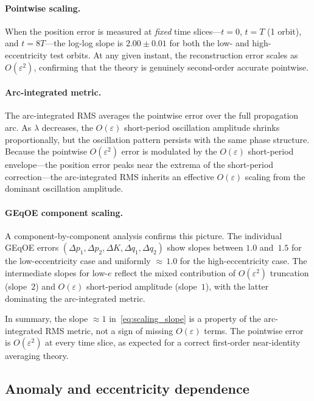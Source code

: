 \documentclass[11pt]{article}
\begin{document}
\paragraph{Pointwise scaling.}
When the position error is measured at \emph{fixed} time slices---$t = 0$,
$t = T$ (1 orbit), and $t = 8T$---the log-log slope is $2.00 \pm 0.01$ for
both the low- and high-eccentricity test orbits. At any given instant, the
reconstruction error scales as $O(\varepsilon^2)$, confirming that the theory
is genuinely second-order accurate pointwise.

\paragraph{Arc-integrated metric.}
The arc-integrated RMS averages the pointwise error over the full propagation
arc. As $\lambda$ decreases, the $O(\varepsilon)$ short-period oscillation
amplitude shrinks proportionally, but the oscillation pattern persists with
the same phase structure. Because the pointwise $O(\varepsilon^2)$ error is
modulated by the $O(\varepsilon)$ short-period envelope---the position error
peaks near the extrema of the short-period correction---the arc-integrated
RMS inherits an effective $O(\varepsilon)$ scaling from the dominant
oscillation amplitude.

\paragraph{GEqOE component scaling.}
A component-by-component analysis confirms this picture. The individual GEqOE
errors $(\Delta p_1, \Delta p_2, \Delta K, \Delta q_1, \Delta q_2)$ show
slopes between $1.0$ and~$1.5$ for the low-eccentricity case and uniformly
${\approx}\,1.0$ for the high-eccentricity case. The intermediate slopes for
low-$e$ reflect the mixed contribution of $O(\varepsilon^2)$ truncation
(slope~$2$) and $O(\varepsilon)$ short-period amplitude (slope~$1$), with
the latter dominating the arc-integrated metric.

In summary, the slope $\approx 1$ in~\eqref{eq:scaling_slope} is a property
of the arc-integrated RMS metric, not a sign of missing $O(\varepsilon)$
terms. The pointwise error is $O(\varepsilon^2)$ at every time slice, as
expected for a correct first-order near-identity averaging theory.

\subsection{Anomaly and eccentricity dependence}
\end{document}
